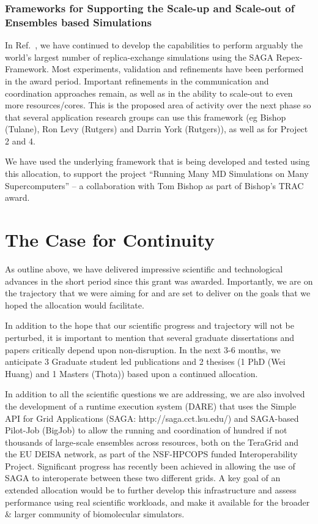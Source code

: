 \documentclass[a4paper,10pt]{article}
\begin{document}
\subsubsection{Frameworks for Supporting the Scale-up and Scale-out of Ensembles based Simulations}

In Ref.~\cite{async-re}, we have continued to develop the capabilities to perform arguably the world's largest number of replica-exchange simulations using the SAGA Repex-Framework. Most experiments, validation and refinements have been performed in the award period. Important refinements in the communication and coordination approaches remain, as well as in the ability to scale-out to even more resources/cores. This is the proposed area of activity over the next phase so that several application research groups can use this framework (eg Bishop (Tulane), Ron Levy (Rutgers) and Darrin York (Rutgers)), as well as for Project 2 and 4.

We have used the underlying framework that is being developed and tested using this allocation, to support the project ``Running Many MD Simulations on Many Supercomputers'' -- a collaboration with Tom Bishop as part of Bishop's TRAC award.


\section{The Case for Continuity}

As outline above, we have delivered impressive scientific and technological advances in the short period since this grant was awarded. Importantly, we are on the trajectory that we were aiming for and are set to deliver on the goals that we hoped the allocation would facilitate.

In addition to the hope that our scientific progress and trajectory will not be perturbed, it is important to mention that several graduate dissertations and papers critically depend upon non-disruption. In the next 3-6 months, we anticipate 3 Graduate student led publications and 2 thesises (1 PhD (Wei Huang) and 1 Masters (Thota)) based upon a continued allocation.

In addition to all the scientific questions we are addressing, we are also involved the development of a runtime execution system (DARE) that uses the Simple API for Grid Applications (SAGA: http://saga.cct.lsu.edu/) and SAGA-based Pilot-Job (BigJob) to allow the running and coordination of hundred if not thousands of large-scale ensembles across resources, both on the TeraGrid and the EU DEISA network, as part of the NSF-HPCOPS funded Interoperability Project. Significant progress has recently been achieved in allowing the use of SAGA to interoperate between these two different grids.  A key goal of an extended allocation would be to further develop this infrastructure and assess performance using real scientific workloads, and make it available for the broader \& larger community of biomolecular simulators.
\end{document}
